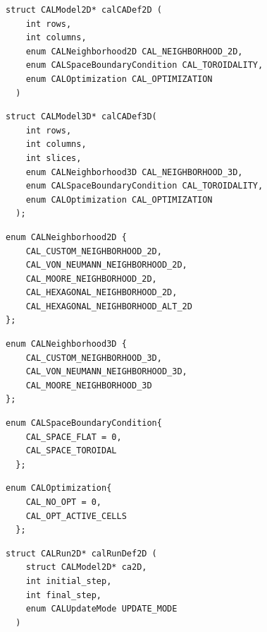 \begin{lstlisting}[float, floatplacement=H, label=lst:calCADef2D, caption=Definition of the calCADef2D() function., numbers=none]
  struct CALModel2D* calCADef2D (
    int rows,
    int columns,
    enum CALNeighborhood2D CAL_NEIGHBORHOOD_2D,
    enum CALSpaceBoundaryCondition CAL_TOROIDALITY,
    enum CALOptimization CAL_OPTIMIZATION
  )
\end{lstlisting}

\begin{lstlisting}[float, label=lst:calCADef3D, caption=Definition of the calCADef3D() function., numbers=none]
  struct CALModel3D* calCADef3D(
    int rows,
    int columns,
    int slices,
    enum CALNeighborhood3D CAL_NEIGHBORHOOD_3D,
    enum CALSpaceBoundaryCondition CAL_TOROIDALITY,
    enum CALOptimization CAL_OPTIMIZATION
  );
\end{lstlisting}

\begin{lstlisting}[float,label=lst:CALNeighborhood2D, caption=The CALNeighborhood2D enum type., numbers=none]
  enum CALNeighborhood2D {
    CAL_CUSTOM_NEIGHBORHOOD_2D,
    CAL_VON_NEUMANN_NEIGHBORHOOD_2D,
    CAL_MOORE_NEIGHBORHOOD_2D,
    CAL_HEXAGONAL_NEIGHBORHOOD_2D,
    CAL_HEXAGONAL_NEIGHBORHOOD_ALT_2D
};
\end{lstlisting}

\begin{lstlisting}[float, label=lst:CALNeighborhood3D, caption=The CALNeighborhood3D enum type., numbers=none]
  enum CALNeighborhood3D {
    CAL_CUSTOM_NEIGHBORHOOD_3D,
    CAL_VON_NEUMANN_NEIGHBORHOOD_3D,
    CAL_MOORE_NEIGHBORHOOD_3D
};
\end{lstlisting}


\begin{lstlisting}[float, label=lst:CALSpaceBoundaryCondition, caption=The CALSpaceBoundaryCondition enum type., numbers=none]
  enum CALSpaceBoundaryCondition{
    CAL_SPACE_FLAT = 0,
    CAL_SPACE_TOROIDAL
  };
\end{lstlisting}

\begin{lstlisting}[float, label=lst:CALOptimization, caption=The CALOptimization enum type., numbers=none]
  enum CALOptimization{
    CAL_NO_OPT = 0,
    CAL_OPT_ACTIVE_CELLS
  };
\end{lstlisting}

\begin{lstlisting}[float, label=lst:calRunDef2D(), caption=Definition of the calRunDef2D() function., numbers=none]
  struct CALRun2D* calRunDef2D (
    struct CALModel2D* ca2D,
    int initial_step,
    int final_step,
    enum CALUpdateMode UPDATE_MODE
  )
\end{lstlisting}

